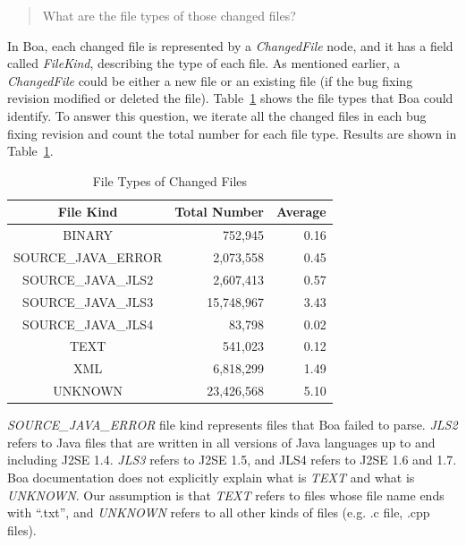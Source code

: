 \documentclass{sig-alternate-05-2015}
\begin{document}
\begin{quote}
	What are the file types of those changed files?
\end{quote}

In Boa, each changed file is represented by a \emph{ChangedFile} node, and it
has a field called \emph{FileKind}, describing the type of each file. As
mentioned earlier, a \emph{ChangedFile} could be either a new file or an
existing file (if the bug fixing revision modified or deleted the file).
Table~\ref{tbl:fileType} shows the file types that Boa could identify. To answer
this question, we iterate all the changed files in each bug fixing revision and
count the total number for each file type. Results are shown in
Table~\ref{tbl:fileType}.

\begin{table}
\centering
  \begin{tabular}{| c | r | r |}
  \hline
  File Kind & Total Number & Average \\ \hline \hline
  BINARY & 752,945 & 0.16 \\ \hline
  SOURCE\_JAVA\_ERROR & 2,073,558 & 0.45 \\ \hline
  SOURCE\_JAVA\_JLS2 & 2,607,413 & 0.57 \\ \hline
  SOURCE\_JAVA\_JLS3 & 15,748,967 & 3.43 \\ \hline
  SOURCE\_JAVA\_JLS4 & 83,798 & 0.02 \\ \hline
  TEXT & 541,023 & 0.12 \\ \hline
  XML & 6,818,299 & 1.49 \\ \hline
  UNKNOWN & 23,426,568 & 5.10 \\ \hline
  \end{tabular}
  \caption{File Types of Changed Files}
  \label{tbl:fileType}
\end{table}

\emph{SOURCE\_JAVA\_ERROR} file kind represents files that Boa failed to parse.
\emph{JLS2} refers to Java files that are written in all versions of Java
languages up to and including J2SE 1.4. \emph{JLS3} refers to J2SE 1.5, and JLS4
refers to J2SE 1.6 and 1.7. Boa documentation does not explicitly explain what
is \emph{TEXT} and what is \emph{UNKNOWN}. Our assumption is that \emph{TEXT}
refers to files whose file name ends with ``.txt'', and \emph{UNKNOWN} refers to
all other kinds of files (e.g. .c file, .cpp files).
\end{document}
